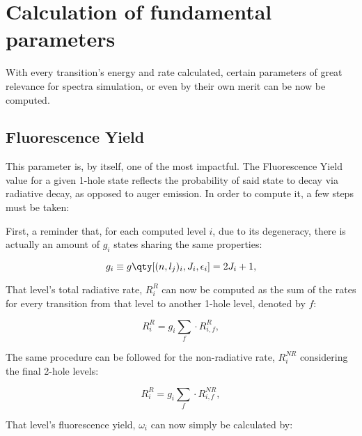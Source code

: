 
%

\chapter{Calculation of fundamental parameters}\label{cha:parameters}

With every transition's energy and rate calculated, certain parameters of great relevance for spectra simulation, or even by their own merit can be now be computed. 

\section{Fluorescence Yield}

This parameter is, by itself, one of the most impactful. The Fluorescence Yield value for a given 1-hole state reflects the probability of said state to decay via radiative decay, as opposed to auger emission. In order to compute it, a few steps must be taken:

First, a reminder that, for each computed level $i$, due to its degeneracy, there is actually an amount of $g_i$ states sharing the same properties:

\begin{equation}
    g_i\equiv g\qty[(n,l_j)_i,J_i,\epsilon_i]=2J_i+1,
    \label{eq:degen}
\end{equation}

That level's total radiative rate, $R_i^{R}$ can now be computed as the sum of the rates for every transition from that level to another 1-hole level, denoted by $f$:

\begin{equation}
    R_i^{R} = g_i \sum_f \cdot R_{i,f}^{R},
\end{equation}

The same procedure can be followed for the non-radiative rate, $R_i^{NR}$ considering the final 2-hole levels:

\begin{equation}
    R_i^{R} = g_i \sum_f \cdot R_{i,f}^{NR},
\end{equation}

That level's fluorescence yield, $\omega_i$ can now simply be calculated by:

